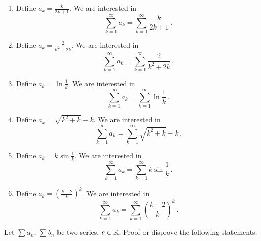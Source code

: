 \documentclass[week=5]{homework}
\begin{document}
\begin{questions}
\begin{enumerate}[label=(\alph*)]
	    	\addtocounter{enumi}{1}
	    	\item Define $a_k = \frac{k}{2k+1}$. We are interested in 
	    	\[
	    	\sum_{k=1}^{\infty} a_k = \sum_{k=1}^{\infty} \frac{k}{2k+1}\,.
	    	\]
	    	
	    	\item Define $a_k = \frac{2}{k^2+2k}$. We are interested in 
	    	\[
	    	\sum_{k=1}^{\infty} a_k = \sum_{k=1}^{\infty} \frac{2}{k^2+2k}\,.
	    	\] 
	    	
	    	\item Define $a_k = \ln \frac{1}{k}$. We are interested in 
	    	\[
	    	\sum_{k=1}^{\infty} a_k = \sum_{k=1}^{\infty} \ln \frac{1}{k}\,.
	    	\] 
	    	
	    	\addtocounter{enumi}{1}
	    	\item Define $a_k = \sqrt{k^2 + k} -k$. We are interested in 
	    	\[
	    	\sum_{k=1}^{\infty} a_k = \sum_{k=1}^{\infty} \sqrt{k^2 + k} -k\,.
	    	\]
	    	
	    	\item Define $a_k = k \sin \frac{1}{k}$. We are interested in 
	    	\[
	    	\sum_{k=1}^{\infty} a_k = \sum_{k=1}^{\infty} k \sin \frac{1}{k}\,.
	    	\] 
	    	
	    	\addtocounter{enumi}{1}
	    	\item Define $a_k = \left(\frac{k-2}{k}\right)^k$. We are interested in 
	    	\[
	    	\sum_{k=1}^{\infty} a_k = \sum_{k=1}^{\infty} \left(\frac{k-2}{k}\right)^k\,.
	    	\]
	    \end{enumerate}
    
	    \question
	    Let $\sum a_n$, $\sum b_n$ be two series, $c\in\mathbb{R}$. Proof or disprove the following statements.
	    
\end{questions}
\end{document}
